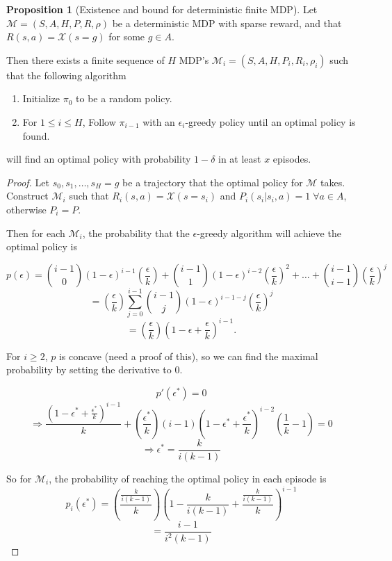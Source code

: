\documentclass[12pt, letterpaper]{article}
\theoremstyle{definition}
\newtheorem*{prop}{Proposition}
\theoremstyle{remark}
\begin{document}
\begin{prop}[Existence and bound for deterministic finite MDP]
    Let \(\mathcal{M} = (S, A, H, P, R, \rho)\) be a deterministic MDP with sparse reward, and that \(R(s, a) = \mathcal{X}(s = g)\) for some \(g \in A\).
    
    Then there exists a finite sequence of $H$ MDP's \(\mathcal{M}_i = (S, A, H, P_i, R_i, \rho_i)\) such that the following algorithm

    \begin{enumerate}
        \item Initialize \(\pi_0\) to be a random policy.
        \item For \(1 \leq i \leq H\), Follow \(\pi_{i-1}\) with an \(\epsilon_i\)-greedy policy until an optimal policy is found.
    \end{enumerate}

    will find an optimal policy with probability \(1 - \delta\) in at least \(x\) episodes.
\end{prop}

\begin{proof}[Proof]
    Let \(s_0, s_1, \ldots, s_H = g\) be a trajectory that the optimal policy for \(\mathcal{M}\) takes.
    Construct \(\mathcal{M}_i\) such that \(R_i(s, a) = \mathcal{X}(s = s_i)\) and \(P_i(s_i | s_i, a) = 1 \; \forall a \in A\), otherwise \(P_i = P\).

    Then for each \(\mathcal{M}_i\), the probability that the \(\epsilon\)-greedy algorithm will achieve the optimal policy is

    \[p(\epsilon) = {i-1 \choose 0} (1-\epsilon)^{i-1}(\frac{\epsilon}{k}) + {i-1 \choose 1}(1-\epsilon)^{i-2}(\frac{\epsilon}{k})^2 + \ldots + {i-1 \choose i-1} (\frac{\epsilon}{k})^j\]
    \[= (\frac{\epsilon}{k})\sum_{j=0}^{i-1}{i-1 \choose j} (1-\epsilon)^{i-1-j}(\frac{\epsilon}{k})^{j}\]
    \[= (\frac{\epsilon}{k})(1-\epsilon + \frac{\epsilon}{k})^{i-1}.\]

    For \(i \geq 2\), \(p\) is concave (need a proof of this), so we can find the maximal probability by setting the derivative to 0.

    \[p'(\epsilon^*) = 0\]
    \[\Rightarrow \frac{(1-\epsilon^* + \frac{\epsilon^*}{k})^{i-1}}{k} + (\frac{\epsilon^*}{k})(i-1)(1 - \epsilon^* + \frac{\epsilon^*}{k})^{i-2}(\frac{1}{k}-1) = 0\]
    \[\Rightarrow \epsilon^* = \frac{k}{i(k-1)}\]

    So for \(\mathcal{M}_i\), the probability of reaching the optimal policy in each episode is
    \[p_i(\epsilon^*) = (\frac{\frac{k}{i(k-1)}}{k})(1 - \frac{k}{i(k-1)} + \frac{\frac{k}{i(k-1)}}{k})^{i-1}\]
    \[= \frac{i-1}{i^2(k-1)}\]

\end{proof}
\end{document}
